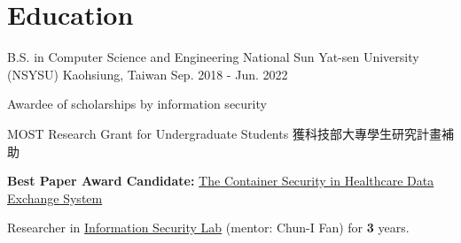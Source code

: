 \section*{Education}
\vspace{-.8em}
\cventry
{B.S. in Computer Science and Engineering} %
{National Sun Yat-sen University (NSYSU)} %
{Kaohsiung, Taiwan} %
{Sep. 2018 - Jun. 2022} %
{
  \begin{cvitem} %
    \item {Awardee of scholarships by information security}
    \item {MOST Research Grant for Undergraduate Students 獲科技部大專學生研究計畫補助}
    \item {\textbf{Best Paper Award Candidate:} \href{https://github.com/25077667/Container_Security}{The Container Security in Healthcare Data Exchange System}}
    \item Researcher in \href{https://cifan.g-mail.nsysu.edu.tw/}{Information Security Lab} (mentor: Chun-I Fan) for \textbf{3} years.
  \end{cvitem}
}

